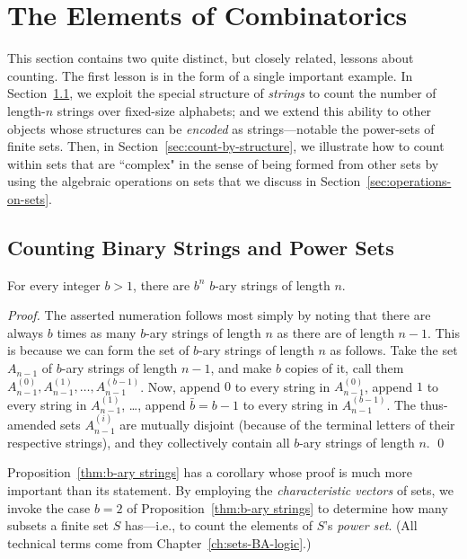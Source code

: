 \section{The Elements of Combinatorics}
\label{sec:counting}

This section contains two quite distinct, but closely related, lessons about counting.  The first lesson
is in the form of a single important example.  In Section~\ref{sec:b-ary strings}, we exploit the special
structure of {\em strings} to count the number of length-$n$ strings over fixed-size alphabets; and we 
extend this ability to other objects whose structures can be {\em encoded} as strings---notable the power-sets
of finite sets.  Then, in Section~\ref{sec:count-by-structure}, we illustrate how to count within sets that
are ``complex" in the sense of being formed from other sets by using the algebraic operations on sets that
we discuss in Section~\ref{sec:operations-on-sets}.


\subsection{Counting Binary Strings and Power Sets}
\label{sec:b-ary strings}

\begin{prop}
\label{thm:b-ary strings}
For every integer $b > 1$, there are $b^n$ $b$-ary strings of length
$n$.
\end{prop}

\begin{proof}
The asserted numeration follows most simply by noting that there are
always $b$ times as many $b$-ary strings of length $n$ as there are of
length $n-1$.  This is because we can form the set of $b$-ary strings
of length $n$ as follows.  Take the set $A_{n-1}$ of $b$-ary strings
of length $n-1$, and make $b$ copies of it, call them $A^{(0)}_{n-1},
A^{(1)}_{n-1}, \ldots, A^{(b-1)}_{n-1}$.  Now, append $0$ to every
string in $A^{(0)}_{n-1}$, append $1$ to every string in
$A^{(1)}_{n-1}$, \ldots, append $\bar{b} = b-1$ to every string in
$A^{(b-1)}_{n-1}$.  The thus-amended sets $A^{(i)}_{n-1}$ are mutually
disjoint (because of the terminal letters of their respective
strings), and they collectively contain all $b$-ary strings of length
$n$.  \qed
\end{proof}

\medskip

Proposition~\ref{thm:b-ary strings} has a corollary whose proof is much more important than its
statement.   By employing the {\em characteristic vectors} of sets, we invoke the case $b=2$ of 
Proposition~\ref{thm:b-ary strings} to determine how many subsets a finite set $S$ has---i.e., to
count the elements of $S$'s {\em power set}.  (All technical terms
come from Chapter~\ref{ch:sets-BA-logic}.)


